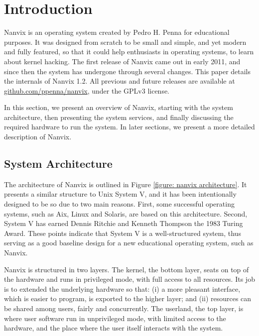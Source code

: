 
\section{Introduction}
\label{section: introduction}

	Nanvix is an operating system created by Pedro H. Penna for
	educational purposes. It was designed from scratch to be small and
	simple, and yet modern and fully featured, so that it could help
	enthusiasts in operating systems, to learn about kernel hacking. The
	first release of Nanvix came out in early 2011, and since then the
	system has undergone through several changes. This paper details the
	internals of Nanvix 1.2.  All previous and future releases are
	available at \url{github.com/ppenna/nanvix}, under the GPLv3
	license.

	In this section, we present an overview of Nanvix, starting with the
	system architecture, then presenting the system services, and
	finally discussing the required hardware to run the system. In later
	sections, we present a more detailed description of Nanvix.

	\subsection{System Architecture}
	\label{section: system architecture}

		The architecture of Nanvix is outlined in Figure \ref{figure:
		nanvix architecture}. It presents a similar structure to Unix
		System V, and it has been intentionally designed to be so due to
		two main reasons.  First, some successful operating systems,
		such as Aix, Linux and Solaris, are based on this architecture.
		Second, System V has earned Dennis Ritchie and Kenneth Thompson
		the 1983 Turing Award. These points indicate that System V is a
		well-structured system, thus serving as a good baseline design
		for a new educational operating system, such as Nanvix.

		Nanvix is structured in two layers. The kernel, the bottom
		layer, seats on top of the hardware and runs in privileged mode,
		with full access to all resources. Its job is to extended the
		underlying hardware so that: (i) a more pleasant interface,
		which is easier to program, is exported to the higher layer; and
		(ii) resources can be shared among users, fairly and
		concurrently. The userland, the top layer, is where user
		software run in unprivileged mode, with limited access to the
		hardware, and the place where the user itself interacts with the
		system.

